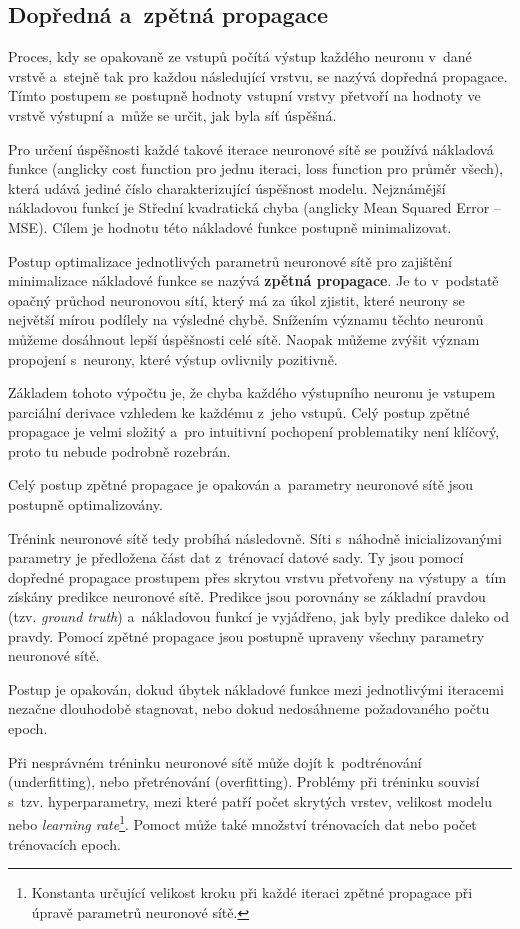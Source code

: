 \subsection{Dopředná a~zpětná propagace}
Proces, kdy se opakovaně ze vstupů počítá výstup každého neuronu v~dané vrstvě a~stejně tak pro každou následující vrstvu, se nazývá dopředná propagace. Tímto postupem se postupně hodnoty vstupní vrstvy přetvoří na hodnoty ve vrstvě výstupní a~může se určit, jak byla síť úspěšná.\par
Pro určení úspěšnosti každé takové iterace neuronové sítě se používá nákladová funkce (anglicky cost function pro jednu iteraci, loss function pro průměr všech), která udává jediné číslo charakterizující úspěšnost modelu. Nejznámější nákladovou funkcí je Střední kvadratická chyba (anglicky Mean Squared Error -- MSE). Cílem je hodnotu této nákladové funkce postupně minimalizovat.\par \medskip
Postup optimalizace jednotlivých parametrů neuronové sítě pro zajištění minimalizace nákladové funkce se nazývá \textbf{zpětná propagace}. Je to v~podstatě opačný průchod neuronovou sítí, který má za úkol zjistit, které neurony se největší mírou podílely na výsledné chybě. Snížením významu těchto neuronů můžeme dosáhnout lepší úspěšnosti celé sítě. Naopak můžeme zvýšit význam propojení s~neurony, které výstup ovlivnily pozitivně.\par
Základem tohoto výpočtu je, že chyba každého výstupního neuronu je vstupem parciální derivace vzhledem ke každému z~jeho vstupů. Celý postup zpětné propagace je velmi složitý a~pro intuitivní pochopení problematiky není klíčový, proto tu nebude podrobně rozebrán.\par
Celý postup zpětné propagace je opakován a~parametry neuronové sítě jsou postupně optimalizovány.\par \medskip
Trénink neuronové sítě tedy probíhá následovně. Síti s~náhodně inicializovanými parametry je předložena část dat z~trénovací datové sady. Ty jsou pomocí dopředné propagace prostupem přes skrytou vrstvu přetvořeny na výstupy a~tím získány predikce neuronové sítě. Predikce jsou porovnány se základní pravdou (tzv. \emph{ground truth}) a~nákladovou funkcí je vyjádřeno, jak byly predikce daleko od pravdy. Pomocí zpětné propagace jsou postupně upraveny všechny parametry neuronové sítě.\par
Postup je opakován, dokud úbytek nákladové funkce mezi jednotlivými iteracemi nezačne dlouhodobě stagnovat, nebo dokud nedosáhneme požadovaného počtu epoch.\par
Při nesprávném tréninku neuronové sítě může dojít k~podtrénování (underfitting), nebo přetrénování (overfitting). Problémy při tréninku souvisí s~tzv. hyperparametry, mezi které patří počet skrytých vrstev, velikost modelu nebo \emph{learning rate}\footnote{Konstanta určující velikost kroku při každé iteraci zpětné propagace při úpravě parametrů neuronové sítě.}. Pomoct může také množství trénovacích dat nebo počet trénovacích epoch.

